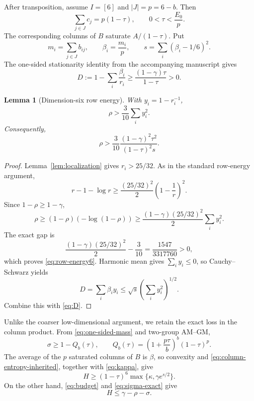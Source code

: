 \documentclass[11pt]{article}
\newtheorem{lemma}[theorem]{Lemma}
\theoremstyle{definition}
\newcommand{\g}{\gamma}
\begin{document}
After transposition, assume $I=[6]$ and $|J|=p=6-b$.  Then
\begin{equation}\label{eq:one-sided-mass}
 \sum_{j\in J}c_j=p(1-\tau),
 \qquad
 0<\tau<\frac{E_0}{p}.
\end{equation}
The corresponding columns of $B$ saturate $A/(1-\tau)$.  Put
\[
 m_i=\sum_{j\in J}b_{ij},
 \qquad \beta_i=\frac{m_i}{p},
 \qquad
 s=\sum_i(\beta_i-1/6)^2.
\]
The one-sided stationarity identity from the accompanying manuscript gives
\begin{equation}\label{eq:D}
 D:=1-\sum_i\frac{\beta_i}{r_i}
 \ge\frac{(1-\g)\tau}{1-\tau}>0.
\end{equation}

\begin{lemma}[Dimension-six row energy]\label{lem:row-energy6}
With $y_i=1-r_i^{-1}$,
\begin{equation}\label{eq:row-energy6}
 \rho>\frac3{10}\sum_i y_i^2.
\end{equation}
Consequently,
\begin{equation}\label{eq:rho-D6}
 \rho>\frac3{10}
 \frac{(1-\g)^2\tau^2}{(1-\tau)^2s}.
\end{equation}
\end{lemma}

\begin{proof}
Lemma~\ref{lem:localization} gives $r_i>25/32$.  As in the standard
row-energy argument,
\[
 r-1-\log r\ge\frac{(25/32)^2}{2}
 \left(1-\frac1r\right)^2.
\]
Since $1-\rho\ge1-\g$,
\[
 \rho\ge(1-\rho)(-\log(1-\rho))
 \ge\frac{(1-\g)(25/32)^2}{2}\sum_i y_i^2.
\]
The exact gap is
\[
 \frac{(1-\g)(25/32)^2}{2}-\frac3{10}
 =\frac{1547}{3317760}>0,
\]
which proves \eqref{eq:row-energy6}.  Harmonic mean gives
$\sum_i y_i\le0$, so Cauchy--Schwarz yields
\[
 D=\sum_i\beta_i y_i
 \le\sqrt{s}\left(\sum_i y_i^2\right)^{1/2}.
\]
Combine this with \eqref{eq:D}.
\end{proof}

Unlike the coarser low-dimensional argument, we retain the exact loss in the
column product.  From \eqref{eq:one-sided-mass} and two-group AM--GM,
\begin{equation}\label{eq:sigma-exact}
 \sigma\ge1-Q_b(\tau),
 \qquad
 Q_b(\tau)=
 \left(1+\frac{p\tau}{b}\right)^b(1-\tau)^p.
\end{equation}
The average of the $p$ saturated columns of $B$ is $\beta$, so convexity and
\eqref{eq:column-entropy-inherited}, together with \eqref{eq:kappa}, give
\begin{equation}\label{eq:one-sided-per-lower}
 H\ge(1-\tau)^6
 \max\{\kappa,\g e^{s/2}\}.
\end{equation}
On the other hand, \eqref{eq:budget} and \eqref{eq:sigma-exact} give
\begin{equation}\label{eq:one-sided-per-upper}
 H\le\g-\rho-\sigma.
\end{equation}
\end{document}
